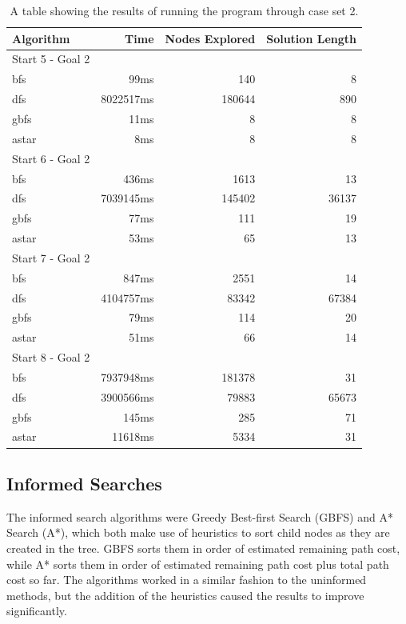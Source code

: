 \documentclass[12pt]{article}
\begin{document}
\begin{table}[h]
\centering
 	\begin{tabular}{l r r r}
   		Algorithm &     Time & Nodes Explored & Solution Length \\
   			\hline
   			Start 5 - Goal 2 \\
   			\hline
   		bfs & 99ms & 140 & 8 \\
   		dfs & 8022517ms & 180644 & 890 \\
   		gbfs & 11ms & 8 & 8 \\
   		astar & 8ms & 8 & 8 \\
   		
   			\hline
   			Start 6 - Goal 2 \\
   			\hline
   		bfs & 436ms & 1613 & 13 \\
   		dfs & 7039145ms & 145402 & 36137 \\
   		gbfs & 77ms & 111 & 19 \\
   		astar & 53ms & 65 & 13 \\	
   				
   			\hline
   			Start 7 - Goal 2 \\
   			\hline
   		bfs & 847ms & 2551 & 14 \\
   		dfs & 4104757ms & 83342 & 67384 \\
   		gbfs & 79ms & 114 & 20 \\
   		astar & 51ms & 66 & 14 \\
   		
   			\hline
   			Start 8 - Goal 2 \\
   			\hline
   		bfs & 7937948ms & 181378 & 31 \\
   		dfs & 3900566ms & 79883 & 65673 \\
   		gbfs & 145ms & 285 & 71 \\
   		astar & 11618ms & 5334 & 31 \\   		
  	\end{tabular}
  	
  	\caption{A table showing the results of running the program through case set 2.}
  	\label{tbl:DataSet2}
\end{table}

\subsection{Informed Searches}
The informed search algorithms were Greedy Best-first Search (GBFS) and A* Search (A*), which both make use of heuristics to sort child nodes as they are created in the tree. GBFS sorts them in order of estimated remaining path cost, while A* sorts them in order of estimated remaining path cost plus total path cost so far. The algorithms worked in a similar fashion to the uninformed methods, but the addition of the heuristics caused the results to improve significantly.
\end{document}
